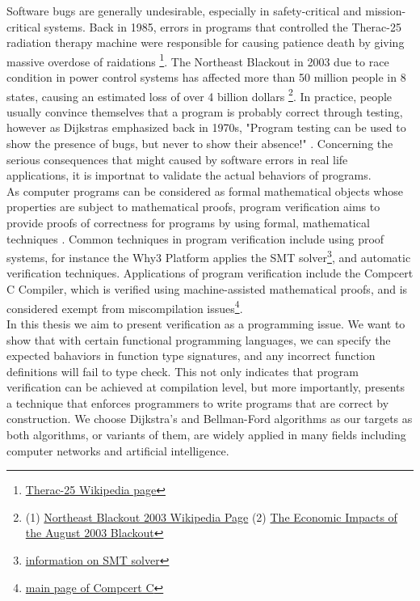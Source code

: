 Software bugs are generally undesirable, especially in safety-critical and mission-critical systems. Back in 1985, errors in programs that controlled the Therac-25 radiation therapy machine were responsible for causing patience death by giving massive overdose of raidations \footnote{\href{https://en.wikipedia.org/wiki/Therac-25}{Therac-25 Wikipedia page}}. The Northeast Blackout in 2003 due to race condition in power control systems has affected more than 50 million people in 8 states, causing an estimated loss of over 4 billion dollars \footnote{(1) \href{https://en.wikipedia.org/wiki/Northeast_blackout_of_2003}{Northeast Blackout 2003 Wikipedia Page} (2) \href{https://elcon.org/wp-content/uploads/Economic20Impacts20of20August20200320Blackout1.pdf}{The Economic Impacts of the August 2003 Blackout}}. In practice, people usually convince themselves that a program is probably correct through testing, however as Dijkstras emphasized back in 1970s, "Program testing can be used to show the presence of bugs, but never to show their absence!" \cite{DijkstrasQuote}. Concerning the serious consequences that might caused by software errors in real life applications, it is importnat to validate the actual behaviors of programs. 
\\

As computer programs can be considered as formal mathematical objects whose properties are subject to mathematical proofs, program verification aims to provide proofs of correctness for programs by using formal, mathematical techniques \cite{Moore}. Common techniques in program verification include using proof systems, for instance the Why3 Platform \cite{why3} applies the SMT solver\footnote{\href{https://en.wikipedia.org/wiki/Satisfiability_modulo_theories}{information on SMT solver}}, and automatic verification techniques. Applications of program verification include the Compcert C Compiler, which is verified using machine-assisted mathematical proofs, and is considered exempt from miscompilation issues\footnote{\href{http://compcert.inria.fr/compcert-C.html}{main page of Compcert C}}. 
\\

In this thesis we aim to present verification as a programming issue. We want to show that with certain functional programming languages, we can specify the expected bahaviors in function type signatures, and any incorrect function definitions will fail to type check. This not only indicates that program verification can be achieved at compilation level, but more importantly, presents a technique that enforces programmers to write programs that are correct by construction. We choose Dijkstra's and Bellman-Ford algorithms as our targets as both algorithms, or variants of them, are widely applied in many fields including computer networks and artificial intelligence. 
\\

